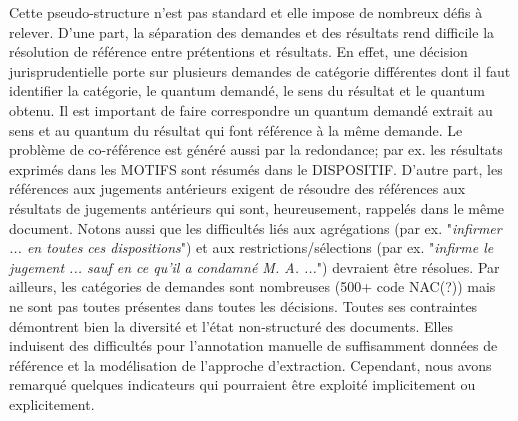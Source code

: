  Cette pseudo-structure n'est pas standard et elle impose de nombreux défis à relever. D'une part, la séparation des demandes et des résultats rend difficile la résolution de référence entre prétentions et résultats. En effet, une décision jurisprudentielle porte sur plusieurs demandes de catégorie différentes dont il faut identifier la catégorie, le quantum demandé, le sens du résultat et le quantum obtenu. Il est important de faire correspondre un quantum demandé extrait au sens et au quantum du résultat qui font référence à la même demande. Le problème de co-référence est généré aussi par la redondance; par ex. les résultats exprimés dans les MOTIFS sont résumés dans le DISPOSITIF. D'autre part, les références aux jugements antérieurs exigent de résoudre des références aux résultats de jugements antérieurs qui sont, heureusement, rappelés dans le même document. Notons aussi que les difficultés liés aux agrégations (par ex. "\textit{infirmer ... en toutes ces dispositions}") et aux restrictions/sélections (par ex. "\textit{infirme le jugement ... sauf en ce qu'il a condamné M. A. ...}") devraient être résolues. Par ailleurs, les catégories de demandes sont nombreuses (500+ code NAC(?)) mais ne sont pas toutes présentes dans toutes les décisions. Toutes ses contraintes démontrent bien la diversité et l'état non-structuré des documents. Elles induisent des difficultés pour l'annotation manuelle de suffisamment données de référence et la modélisation de l'approche d'extraction. Cependant, nous avons remarqué quelques indicateurs qui pourraient être exploité implicitement ou explicitement.

